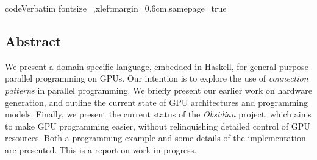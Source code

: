 





   \DefineVerbatimEnvironment
     {code}{Verbatim}
     {fontsize=\small,xleftmargin=0.6cm,samepage=true}

%


       



\subsection*{Abstract}

We present a domain specific language, embedded in Haskell, for general
purpose parallel programming on GPUs. Our intention is to explore the use of
{\em connection patterns} in parallel programming. We briefly present our
earlier work on hardware generation, and outline the current state of GPU
architectures and programming models. Finally, we present the current status
of the {\em Obsidian} project, which aims to make GPU programming easier,
without relinquishing detailed control of GPU resources. Both a programming
example and some details of the implementation are presented. This is a
report on work in progress.








%
%

%
